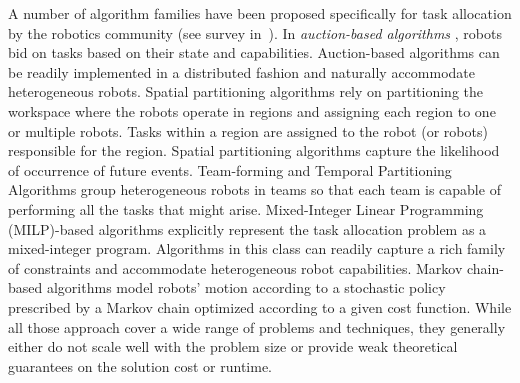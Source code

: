 \documentclass[conference]{IEEEtran}
\newcommand{\frline}[2]{{\color{blue}#1}{\em \color{blue}[FR]: #2}}
\newcommand{\frline}[2]{#1}
\begin{document}
A number of algorithm families have been proposed specifically for 
task allocation by the robotics community (see survey in~\cite{RossiBandyopadhyayEtAl2018}). In \emph{auction-based algorithms} \cite{Mataric04,Ayanian17}, robots bid on tasks based on their state and capabilities. Auction-based algorithms can be readily implemented in a distributed fashion and naturally accommodate heterogeneous robots. Spatial partitioning algorithms \cite{PavoneFrazzoliEtAl2011} rely on partitioning the workspace where the robots operate in regions and assigning each region to one or multiple robots. Tasks within a region are assigned to the robot (or robots) responsible for the region. Spatial partitioning algorithms capture the likelihood of occurrence of future events. %
Team-forming and Temporal Partitioning Algorithms \cite{Smith09} group heterogeneous robots in teams so that each team is capable of performing all the tasks that might arise. %
Mixed-Integer Linear Programming (MILP)-based algorithms \cite{Bellingham03} explicitly represent the task allocation problem as a mixed-integer program. Algorithms in this class can readily capture a rich family of constraints and accommodate heterogeneous robot capabilities. %
Markov chain-based algorithms \cite{Bandyopadhyay17} model robots' motion according to a stochastic policy prescribed by a Markov chain optimized according to a given cost function. %
While all those approach cover a wide range of problems and techniques, they generally either do not scale well with the problem size or provide weak theoretical guarantees on the solution cost or runtime.
\end{document}
